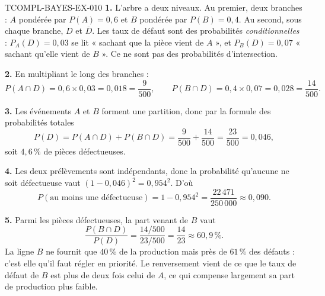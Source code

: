 \begin{corrige}{TCOMPL-BAYES-EX-010}
\textbf{1.} L'arbre a deux niveaux. Au premier, deux branches : $A$ pondérée par
$P(A)=0{,}6$ et $B$ pondérée par $P(B)=0{,}4$. Au second, sous chaque branche,
$D$ et $\overline{D}$. Les taux de défaut sont des probabilités
\emph{conditionnelles} : $P_A(D)=0{,}03$ se lit « sachant que la pièce vient de
$A$ », et $P_B(D)=0{,}07$ « sachant qu'elle vient de $B$ ». Ce ne sont pas des
probabilités d'intersection.

\textbf{2.} En multipliant le long des branches :
\[
  P(A\cap D)=0{,}6\times 0{,}03=0{,}018=\dfrac{9}{500},
  \qquad
  P(B\cap D)=0{,}4\times 0{,}07=0{,}028=\dfrac{14}{500}.
\]

\textbf{3.} Les événements $A$ et $B$ forment une partition, donc par la formule
des probabilités totales
\[
  P(D)=P(A\cap D)+P(B\cap D)=\dfrac{9}{500}+\dfrac{14}{500}=\dfrac{23}{500}=0{,}046,
\]
soit $4{,}6\,\%$ de pièces défectueuses.

\textbf{4.} Les deux prélèvements sont indépendants, donc la probabilité
qu'aucune ne soit défectueuse vaut $(1-0{,}046)^2=0{,}954^2$. D'où
\[
  P(\text{au moins une défectueuse})=1-0{,}954^2=\dfrac{22\,471}{250\,000}\approx 0{,}090.
\]

\textbf{5.} Parmi les pièces défectueuses, la part venant de $B$ vaut
\[
  \dfrac{P(B\cap D)}{P(D)}=\dfrac{14/500}{23/500}=\dfrac{14}{23}\approx 60{,}9\,\%.
\]
La ligne $B$ ne fournit que $40\,\%$ de la production mais près de $61\,\%$ des
défauts : c'est elle qu'il faut régler en priorité. Le renversement vient de ce
que le taux de défaut de $B$ est plus de deux fois celui de $A$, ce qui compense
largement sa part de production plus faible.
\end{corrige}

